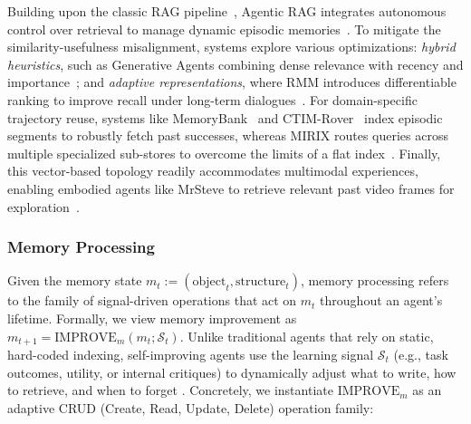 \begin{itemize}[leftmargin=*]
    Building upon the classic RAG pipeline~\citep{lewis2021retrievalaugmentedgenerationknowledgeintensivenlp}, Agentic RAG integrates autonomous control over retrieval to manage dynamic episodic memories~\citep{ravuru2024agenticretrievalaugmentedgenerationtime, singh2025agenticretrievalaugmentedgenerationsurvey}. To mitigate the similarity-usefulness misalignment, systems explore various optimizations: \textit{hybrid heuristics}, such as Generative Agents combining dense relevance with recency and importance~\citep{park2023generativeagentsinteractivesimulacra}; and \textit{adaptive representations}, where RMM introduces differentiable ranking to improve recall under long-term dialogues~\citep{tan2025prospectretrospectreflectivememory}. For domain-specific trajectory reuse, systems like MemoryBank~\citep{zhong2024memorybank} and CTIM-Rover~\citep{lindenbauer2025knowledgenoisectimroverpitfalls} index episodic segments to robustly fetch past successes, whereas MIRIX routes queries across multiple specialized sub-stores to overcome the limits of a flat index~\citep{wang2025mirixmultiagentmemoryllmbased}. Finally, this vector-based topology readily accommodates multimodal experiences, enabling embodied agents like MrSteve to retrieve relevant past video frames for exploration~\citep{park2025mrsteveinstructionfollowingagentsminecraft}.

\end{itemize}

\subsubsection{Memory Processing}
\label{sec:Memory_Processing}
Given the memory state $m_t := (\text{object}_t,\text{structure}_t)$, memory processing refers to the family of signal-driven operations that act on $m_t$ throughout an agent's lifetime.  Formally, we view memory improvement as $m_{t+1} = \text{IMPROVE}_m(m_t; \mathcal{S}_t)$. Unlike traditional agents that rely on static, hard-coded indexing, self-improving agents use the learning signal $\mathcal{S}_t$ (e.g., task outcomes, utility, or internal critiques) to dynamically adjust what to write, how to retrieve, and when to forget \citep{xu2025sedmscalableselfevolvingdistributed, liang2025selfevolvingagentsreflectivememoryaugmented}. Concretely, we instantiate $\text{IMPROVE}_m$ as an adaptive CRUD (Create, Read, Update, Delete) operation family: 


